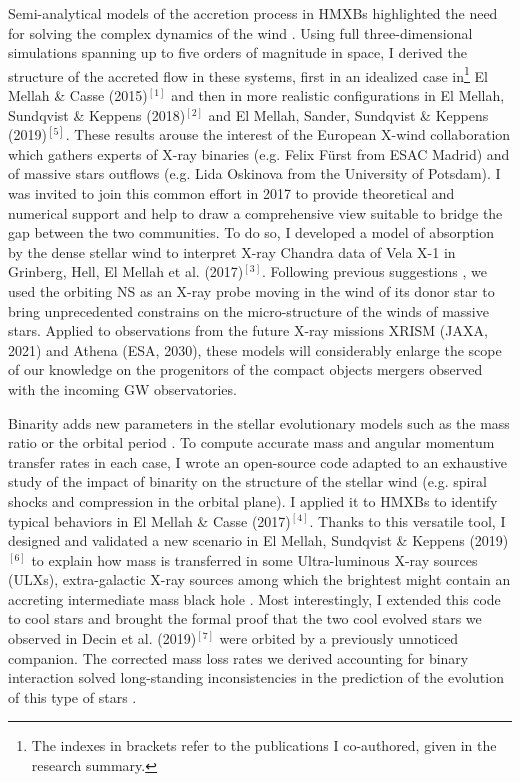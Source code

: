 \documentclass[11pt,onecolumn]{article}
\makeatletter
\newcommand{\ulxs}{ULXs\xspace}
\newcommand{\gw}{GW\xspace}
\newcommand*{\hmxbs}{HMXBs\@\xspace}
\newcommand*{\ns}{NS\@\xspace}
\newcommand*{\eg}{e.g.\@\xspace}
\makeatother
\begin{document}
Semi-analytical models of the accretion process in \hmxbs highlighted the need for solving the complex dynamics of the wind \citep{Ducci2009}. Using full three-dimensional simulations spanning up to five orders of magnitude in space, I derived the structure of the accreted flow in these systems, first in an idealized case in\footnote{The indexes in brackets refer to the publications I co-authored, given in the research summary.} El Mellah \& Casse (2015)$^{\left[1\right]}$ and then in more realistic configurations in El Mellah, Sundqvist \& Keppens (2018)$^{\left[2\right]}$ and El Mellah, Sander, Sundqvist \& Keppens (2019)$^{\left[5\right]}$. These results arouse the interest of the European X-wind collaboration which gathers experts of X-ray binaries (\eg Felix F\"{u}rst from ESAC Madrid) and of massive stars outflows (\eg Lida Oskinova from the University of Potsdam). I was invited to join this common effort in 2017 to provide theoretical and numerical support and help to draw a comprehensive view suitable to bridge the gap between the two communities. To do so, I developed a model of absorption by the dense stellar wind to interpret X-ray Chandra data of Vela X-1 in Grinberg, Hell, El Mellah et al. (2017)$^{\left[3\right]}$. Following previous suggestions \citep{Martinez-Nunez2017}, we used the orbiting \ns as an X-ray probe moving in the wind of its donor star to bring unprecedented constrains on the micro-structure of the winds of massive stars. Applied to observations from the future X-ray missions XRISM (JAXA, 2021) and Athena (ESA, 2030), these models will considerably enlarge the scope of our knowledge on the progenitors of the compact objects mergers observed with the incoming \gw observatories. 

Binarity adds new parameters in the stellar evolutionary models such as the mass ratio or the orbital period \citep{Sana2012}. To compute accurate mass and angular momentum transfer rates in each case, I wrote an open-source code adapted to an exhaustive study of the impact of binarity on the structure of the stellar wind (\eg spiral shocks and compression in the orbital plane). I applied it to \hmxbs to identify typical behaviors in El Mellah \& Casse (2017)$^{\left[4\right]}$. Thanks to this versatile tool, I designed and validated a new scenario in El Mellah, Sundqvist \& Keppens (2019)$^{\left[6\right]}$ to explain how mass is transferred in some Ultra-luminous X-ray sources (\ulxs), extra-galactic X-ray sources among which the brightest might contain an accreting intermediate mass black hole \citep{Webb2014}. Most interestingly, I extended this code to cool stars and brought the formal proof that the two cool evolved stars we observed in Decin et al. (2019)$^{\left[7\right]}$ were orbited by a previously unnoticed companion. The corrected mass loss rates we derived accounting for binary interaction solved long-standing inconsistencies in the prediction of the evolution of this type of stars \citep{Renzini1981}.
\end{document}
